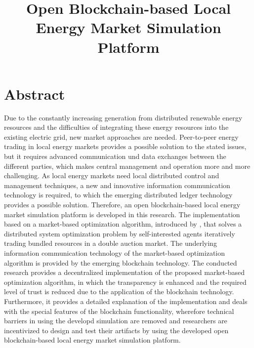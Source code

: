 \documentclass[a4paper, 12pt]{article}
\title{Open Blockchain-based Local Energy Market Simulation Platform}
\begin{document}




\clearpage
\thispagestyle{empty}

\section*{Abstract}

Due to the constantly increasing generation from distributed renewable energy resources and the 
difficulties of integrating these energy resources into the existing electric grid, new market approaches
are needed. 
Peer-to-peer energy trading in local energy markets provides a possible solution to the stated issues,
but it requires advanced communication und data exchanges between the different parties, which makes 
central management and operation more and more challenging.
As local energy markets need local distributed control and management techniques, a new and innovative 
information communication technology is required, to which the emerging distributed ledger technology
provides a possible solution.
Therefore, an open blockchain-based local energy market simulation platform is developed in this research.
The implementation
based on a market-based optimization algorithm, introduced by , that solves a 
distributed system optimization problem by self-interested agents iteratively trading bundled resources in a double auction market.
The underlying information communication technology of the market-based optimization algorithm 
is provided by the emerging blockchain technology.
The conducted research provides a decentralized implementation of the proposed market-based optimization algorithm, 
in which the transparency is enhanced and the required level of trust is reduced due to the application of 
the blockchain technology. Furthermore, it provides a detailed explanation of the implementation and deals with 
the special features of the blockchain functionality, wherefore technical barriers in using the developd simulation are 
removed and researchers are incentivized to design and test their artifacts by using the developed open blockchain-based 
local energy market simulation platform.
 
\end{document}
